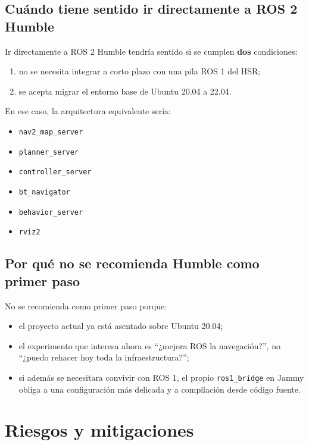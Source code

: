 \documentclass[11pt,a4paper]{article}
\begin{document}
\subsection{Cuándo tiene sentido ir directamente a ROS 2 Humble}

Ir directamente a ROS 2 Humble tendría sentido si se cumplen \textbf{dos}
condiciones:

\begin{enumerate}
  \item no se necesita integrar a corto plazo con una pila ROS 1 del HSR;
  \item se acepta migrar el entorno base de Ubuntu 20.04 a 22.04.
\end{enumerate}

En ese caso, la arquitectura equivalente sería:

\begin{itemize}
  \item \texttt{nav2\_map\_server}
  \item \texttt{planner\_server}
  \item \texttt{controller\_server}
  \item \texttt{bt\_navigator}
  \item \texttt{behavior\_server}
  \item \texttt{rviz2}
\end{itemize}

\subsection{Por qué no se recomienda Humble como primer paso}

No se recomienda como primer paso porque:

\begin{itemize}
  \item el proyecto actual ya está asentado sobre Ubuntu 20.04;
  \item el experimento que interesa ahora es ``¿mejora ROS la navegación?'', no
        ``¿puedo rehacer hoy toda la infraestructura?'';
  \item si además se necesitara convivir con ROS 1, el propio \texttt{ros1\_bridge}
        en Jammy obliga a una configuración más delicada y a compilación desde
        código fuente.
\end{itemize}

\section{Riesgos y mitigaciones}
\end{document}
